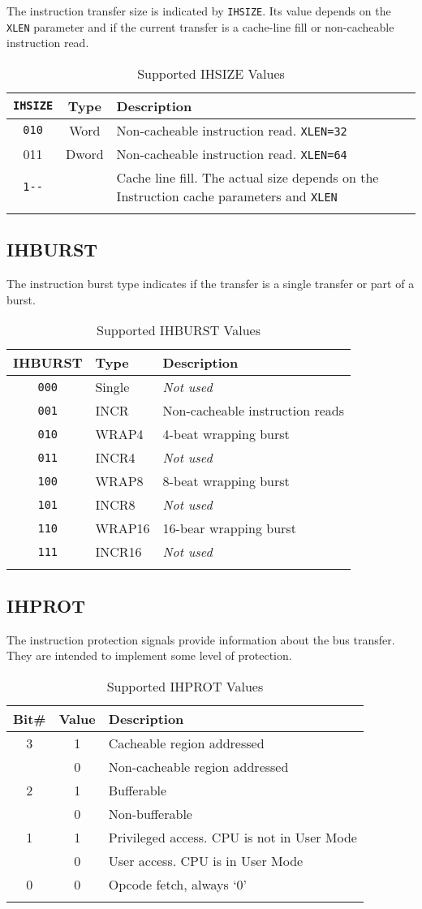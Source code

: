 The instruction transfer size is indicated by \texttt{IHSIZE}. Its value depends
on the \texttt{XLEN} parameter and if the current transfer is a cache-line fill
or non-cacheable instruction read.

\begin{longtable}[]{@{}ccp{7cm}@{}}
\toprule
\texttt{IHSIZE} & Type & Description\tabularnewline
\midrule
\endhead
\texttt{010} & Word & Non-cacheable instruction read. \texttt{XLEN=32}\tabularnewline
011 & Dword & Non-cacheable instruction read. \texttt{XLEN=64}\tabularnewline
\texttt{1-\/-} & & Cache line fill. The actual size depends on the Instruction
cache parameters and \texttt{XLEN}\tabularnewline
\bottomrule
\caption{Supported IHSIZE Values}
\label{tab:isize-values}
\end{longtable}

\subsection{IHBURST}\label{ihburst}

The instruction burst type indicates if the transfer is a single
transfer or part of a burst.

\begin{longtable}[]{@{}cll@{}}
\toprule
IHBURST & Type & Description\tabularnewline
\midrule
\endhead
\texttt{000} & Single & \emph{Not used}\tabularnewline
\texttt{001} & INCR & Non-cacheable instruction reads\tabularnewline
\texttt{010} & WRAP4 & 4-beat wrapping burst\tabularnewline
\texttt{011} & INCR4 & \emph{Not used}\tabularnewline
\texttt{100} & WRAP8 & 8-beat wrapping burst\tabularnewline
\texttt{101} & INCR8 & \emph{Not used}\tabularnewline
\texttt{110} & WRAP16 & 16-bear wrapping burst\tabularnewline
\texttt{111} & INCR16 & \emph{Not used}\tabularnewline
\bottomrule
\caption{Supported IHBURST Values}
\label{tab:ihburst-values}
\end{longtable}

\subsection{IHPROT}\label{ihprot}

The instruction protection signals provide information about the bus
transfer. They are intended to implement some level of protection.

\begin{longtable}[]{@{}ccl@{}}
\toprule
Bit\# & Value & Description\tabularnewline
\midrule
\endhead
3 & 1 & Cacheable region addressed\tabularnewline
& 0 & Non-cacheable region addressed\tabularnewline
2 & 1 & Bufferable\tabularnewline
& 0 & Non-bufferable\tabularnewline
1 & 1 & Privileged access. CPU is not in User Mode\tabularnewline
& 0 & User access. CPU is in User Mode\tabularnewline
0 & 0 & Opcode fetch, always `0'\tabularnewline
\bottomrule
\caption{Supported IHPROT Values}
\label{tab:ihprot-values}
\end{longtable}


